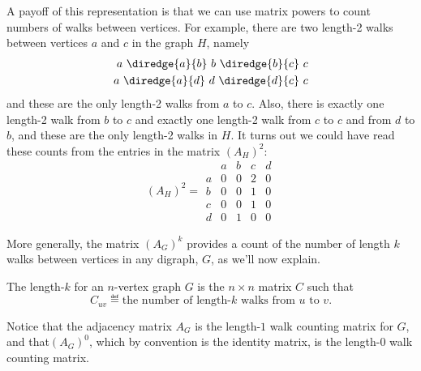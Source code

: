 A payoff of this representation is that we can use matrix powers to
count numbers of walks between vertices.  For example, there are two
length-2 walks between vertices $a$ and $c$ in the graph $H$, namely
\begin{align*}
a\ \diredge{a}{b}\ b\ \diredge{b}{c}\  c\\
a\ \diredge{a}{d}\ d\ \diredge{d}{c}\ c
\end{align*}
and these are the only length-2 walks from $a$ to $c$.  Also, there is
exactly one length-2 walk from $b$ to $c$ and exactly one length-2
walk from $c$ to $c$ and from $d$ to $b$, and these are the only
length-2 walks in $H$.  It turns out we could have read these counts
from the entries in the matrix $(A_H)^2$:
\[
(A_H)^2 = \begin{array}{c|cccc|}
  &  a & b & c & d \\ \hline
a &  0 & 0 & 2 & 0 \\
b &  0 & 0 & 1 & 0 \\
c &  0 & 0 & 1 & 0 \\
d &  0 & 1 & 0 & 0
\end{array}
\]

\iffalse
If $G$ is a weighted graph with edge weights given by $w: E \to
\reals$, then the adjacency matrix for~$G$ is $A_G = \{ a_{ij} \}$
where
\begin{equation*}
    a_{ij} = \begin{cases}
                w(\edge{v_i}{v_j}) & \text{if $\edge{v_i}{v_j} \in E$} \\
                0                 & \text{otherwise.}
              \end{cases}
\end{equation*}
\end{definition}

For example, Figure~\ref{fig:adjacency_matrix} displays the adjacency
matrices for the graphs shown in Figures~\ref{fig:isomorphism}(a)
and~\ref{fig:weighted_graph} where $v_1 = a$, $v_2 = b$, $v_3 = c$,
and $v_4 = d$.
\fi

More generally, the matrix $(A_G)^k$ provides a count of the number of
length $k$ walks between vertices in any digraph, $G$, as we'll now
explain.

\begin{definition}
  The length-$k$  for an $n$-vertex graph $G$
  is the $n \times n$ matrix $C$ such that
\begin{equation}\label{def:walk_matrix}
C_{uv} \eqdef \text{the number of length-$k$ walks from $u$ to $v$}.
\end{equation}
\end{definition}
Notice that the adjacency matrix $A_G$ is the length-$1$ walk counting
matrix for $G$, and that$(A_G)^0$, which by convention is the identity
matrix, is the length-0 walk counting matrix.

